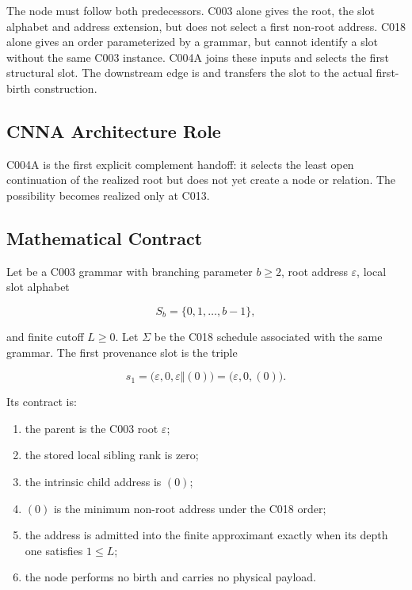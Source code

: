 The node must follow both predecessors. C003 alone gives the root, the
slot alphabet and address extension, but does not select a first
non-root address. C018 alone gives an order parameterized by a grammar,
but cannot identify a slot without the same C003 instance. C004A joins
these inputs and selects the first structural slot. The downstream edge
\texttt{\protect{}} is
\texttt{\protect{}} and transfers the slot to the actual
first-birth construction.

\subsection{CNNA Architecture Role}\label{cnna-architecture-role-3}

C004A is the first explicit complement handoff: it selects the least
open continuation of the realized root but does not yet create a node or
relation. The possibility becomes realized only at C013.

\subsection{Mathematical Contract}\label{mathematical-contract-2}

Let \texttt{\protect{}} be a C003 grammar with branching parameter \(b\ge2\),
root address \(\varepsilon\), local slot alphabet

\[
S_b=\{0,1,\ldots,b-1\},
\]

and finite cutoff \(L\ge0\). Let \(\Sigma\) be the C018 schedule
associated with the same grammar. The first provenance slot is the
triple

\[
s_1=\bigl(\varepsilon,0,\varepsilon\Vert(0)\bigr)
   =\bigl(\varepsilon,0,(0)\bigr).
\]

Its contract is:

\begin{enumerate}
\def\labelenumi{\arabic{enumi}.}
\tightlist
\item
  the parent is the C003 root \(\varepsilon\);
\item
  the stored local sibling rank is zero;
\item
  the intrinsic child address is \((0)\);
\item
  \((0)\) is the minimum non-root address under the C018 order;
\item
  the address is admitted into the finite approximant exactly when its
  depth one satisfies \(1\le L\);
\item
  the node performs no birth and carries no physical payload.
\end{enumerate}

